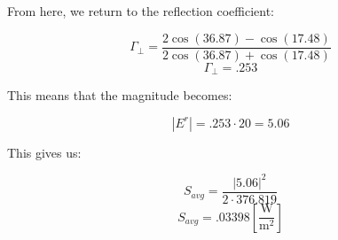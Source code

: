 \begin{enumerate}
\begin{enumerate}
        From here, we return to the reflection coefficient:

        $$\Gamma_{\perp}=\frac{2\cos(36.87)-\cos(17.48)}{2\cos(36.87)+\cos(17.48)}$$
        $$\Gamma_{\perp}=.253$$

        This means that the magnitude becomes:

        $$|E^r|=.253\cdot20=5.06$$

        This gives us:

        $$S_{avg}=\frac{|5.06|^2}{2\cdot376.819}$$
        $$\boxed{S_{avg}=.03398\left[ \frac{\si{\watt}}{\si{\meter\squared}} \right]}$$

    \end{enumerate}

\end{enumerate}



